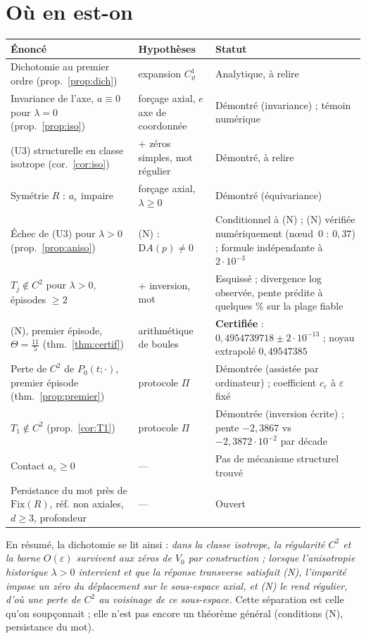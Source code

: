\documentclass[11pt,a4paper]{article}
\theoremstyle{remark}
\newcommand{\vth}{\vartheta}
\newcommand{\D}{\mathrm D}
\begin{document}
\section{Où en est-on}
\begin{center}\small
\begin{tabular}{p{6.3cm}p{4.2cm}p{4.0cm}}
\toprule
Énoncé & Hypothèses & Statut\\\midrule
Dichotomie au premier ordre (prop.~\ref{prop:dich}) & expansion $C^1_\vth$ & Analytique, à relire\\
Invariance de l'axe, $a\equiv0$ pour $\lambda=0$ (prop.~\ref{prop:iso}) & forçage axial, $e$ axe de coordonnée & Démontré (invariance) ; témoin numérique\\
(U3) structurelle en classe isotrope (cor.~\ref{cor:iso}) & + zéros simples, mot régulier & Démontré, à relire\\
Symétrie $R$ : $a_\varepsilon$ impaire & forçage axial, $\lambda\ge0$ & Démontré (équivariance)\\
Échec de (U3) pour $\lambda>0$ (prop.~\ref{prop:aniso}) & (N) : $\D A(p)\ne0$ & Conditionnel à (N) ; (N) vérifiée numériquement (nœud~0 : $0{,}37$) ; formule indépendante à $2\cdot10^{-3}$\\
$T_j\notin C^2$ pour $\lambda>0$, épisodes $\ge2$ & + inversion, mot & Esquissé ; divergence log observée, pente prédite à quelques \% sur la plage fiable\\
(N), premier épisode, $\Theta=\frac{11}5$ (thm.~\ref{thm:certif}) & arithmétique de boules & \textbf{Certifiée} : $0{,}4954739718\pm2\cdot10^{-13}$ ; noyau extrapolé $0{,}49547385$\\
Perte de $C^2$ de $P_0(t;\cdot)$, premier épisode (thm.~\ref{prop:premier}) & protocole $\Pi$ & Démontrée (assistée par ordinateur) ; coefficient $c_\varepsilon$ à $\varepsilon$ fixé\\
$T_1\notin C^2$ (prop.~\ref{cor:T1}) & protocole $\Pi$ & Démontrée (inversion écrite) ; pente $-2{,}3867$ vs $-2{,}3872\cdot10^{-2}$ par décade\\
Contact $a_\varepsilon\ge0$ & --- & Pas de mécanisme structurel trouvé\\
Persistance du mot près de $\mathrm{Fix}(R)$, réf. non axiales, $d\ge3$, profondeur & --- & Ouvert\\\bottomrule
\end{tabular}
\end{center}
\noindent En résumé, la dichotomie se lit ainsi : \emph{dans la classe isotrope, la régularité $C^2$ et la borne $O(\varepsilon)$ survivent aux zéros de $V_0$ par construction ; lorsque l'anisotropie historique $\lambda>0$ intervient et que la réponse transverse satisfait (N), l'imparité impose un zéro du déplacement sur le sous-espace axial, et (N) le rend régulier, d'où une perte de $C^2$ au voisinage de ce sous-espace.} Cette séparation est celle qu'on soupçonnait ; elle n'est pas encore un théorème général (conditions (N), persistance du mot).
\end{document}
